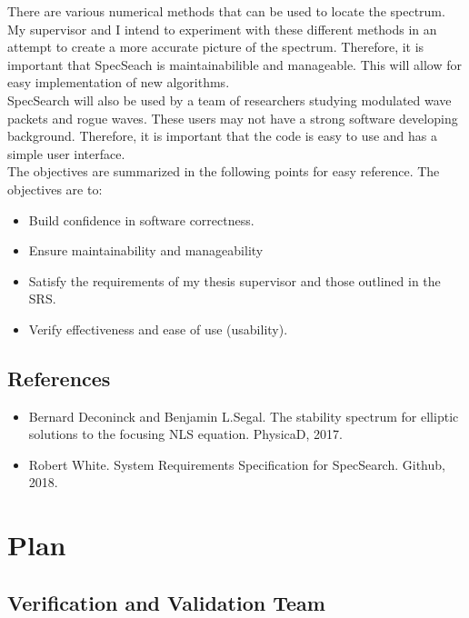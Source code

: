 \documentclass[12pt, titlepage]{article}
\begin{document}
	There are various numerical methods that can be used to locate the 
	spectrum. My supervisor and I intend to experiment with these different 
	methods in an attempt to create a more accurate picture of the spectrum. 
	Therefore, it is important that SpecSeach is maintainabilible and 
	manageable. This will allow for easy implementation of new algorithms. \\
	
	 SpecSearch will also be used by a team of researchers studying modulated 
	 wave packets and rogue waves. These users may not have a strong software 
	 developing background. Therefore, it is important that the code is easy to 
	 use and has a simple user interface. \\
	 
	 The objectives are summarized in the following points for easy reference. 
	 The objectives are to:
	
\begin{itemize}
	\item Build confidence in software correctness.
	\item Ensure maintainability and manageability 
	\item Satisfy the requirements of my thesis supervisor and those outlined 
	in the SRS. 
	\item Verify effectiveness and ease of use (usability).	
\end{itemize}

\subsection{References}

\begin{itemize} 

	\item 	Bernard Deconinck and Benjamin L.Segal. 
	The stability spectrum for elliptic solutions to the focusing NLS equation. 
	PhysicaD, 2017.  
	\item Robert White. System Requirements Specification for SpecSearch. 
	Github, 2018.
	
\end{itemize}

\section{Plan}
	
\subsection{Verification and Validation Team}
\end{document}

